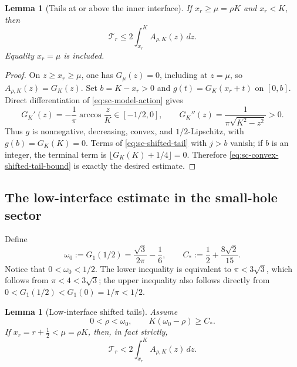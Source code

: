 \documentclass[11pt]{article}
\numberwithin{equation}{section}
\newtheorem{lemma}[theorem]{Lemma}
\theoremstyle{definition}
\theoremstyle{remark}
\begin{document}
\begin{lemma}[Tails at or above the inner interface]
\label{lem:sc-high-interface-tails}
If \(x_r\ge\mu=\rho K\) and \(x_r<K\), then
\[
  \mathcal T_r\le2\int_{x_r}^{K}A_{\rho,K}(z)\,dz.
\]
Equality \(x_r=\mu\) is included.
\end{lemma}

\begin{proof}
On \(z\ge x_r\ge\mu\), one has \(G_\mu(z)=0\), including at \(z=\mu\),
so \(A_{\rho,K}(z)=G_K(z)\).  Set \(b=K-x_r>0\) and
\(g(t)=G_K(x_r+t)\) on \([0,b]\).  Direct differentiation of
\eqref{eq:sc-model-action} gives
\[
  G_K'(z)=-\frac1\pi\arccos\frac zK\in[-1/2,0],
  \qquad
  G_K''(z)=\frac1{\pi\sqrt{K^2-z^2}}>0.
\]
Thus \(g\) is nonnegative, decreasing, convex, and \(1/2\)-Lipschitz, with
\(g(b)=G_K(K)=0\).  Terms of \eqref{eq:sc-shifted-tail} with \(j>b\) vanish;
if \(b\) is an integer, the terminal term is
\(\lfloor G_K(K)+1/4\rfloor=0\).  Therefore
\eqref{eq:sc-convex-shifted-tail-bound} is exactly the desired estimate.
\end{proof}

\subsection{The low-interface estimate in the small-hole sector}

Define
\begin{equation}
  \omega_0:=G_1(1/2)=\frac{\sqrt3}{2\pi}-\frac16,
  \qquad
  C_*:=\frac12+\frac{8\sqrt2}{15}.
  \label{eq:sc-small-hole-constants}
\end{equation}
Notice that \(0<\omega_0<1/2\).  The lower inequality is equivalent to
\(\pi<3\sqrt3\), which follows from \(\pi<4<3\sqrt3\); the upper inequality
also follows directly from \(0<G_1(1/2)<G_1(0)=1/\pi<1/2\).

\begin{lemma}[Low-interface shifted tails]
\label{lem:sc-low-interface-tails}
Assume
\begin{equation}
  0<\rho<\omega_0,
  \qquad
  K(\omega_0-\rho)\ge C_*.
  \label{eq:sc-low-interface-sector}
\end{equation}
If \(x_r=r+\tfrac12<\mu=\rho K\), then, in fact strictly,
\begin{equation}
  \mathcal T_r
  <2\int_{x_r}^{K}A_{\rho,K}(z)\,dz.
  \label{eq:sc-low-tail-conclusion}
\end{equation}
\end{lemma}
\end{document}
